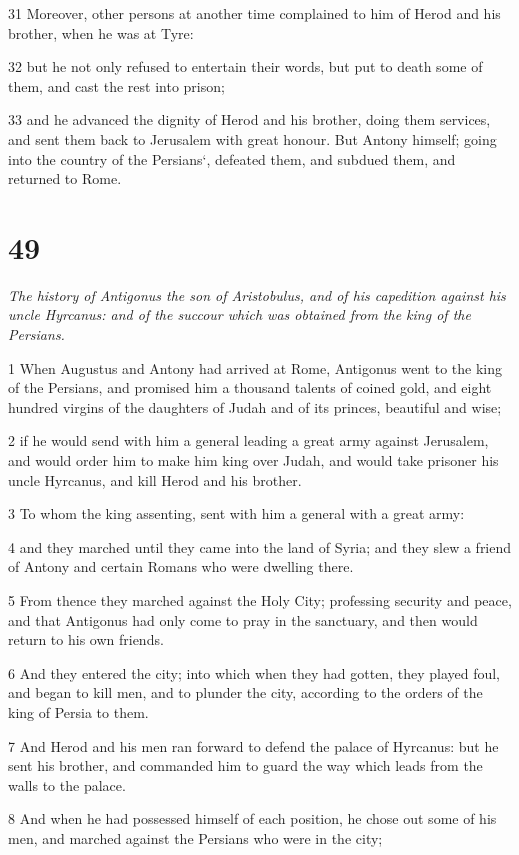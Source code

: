 31 Moreover, other persons at another time complained to him of Herod and his brother, when he was at Tyre: 

32 but he not only refused to entertain their words, but put to death some of them, and cast the rest into prison; 

33 and he advanced the dignity of Herod and his brother, doing them services, and sent them back to Jerusalem with great honour. But Antony himself; going into the country of the Persians‘, defeated them, and subdued them, and returned to Rome. 

\chapter{49}

\par \textit{The history of Antigonus the son of Aristobulus, and of his capedition against his uncle Hyrcanus: and of the succour which was obtained from the king of the Persians.}

1 When Augustus and Antony had arrived at Rome, Antigonus went to the king of the Persians, and promised him a thousand talents of coined gold, and eight hundred virgins of the daughters of Judah and of its princes, beautiful and wise; 

2 if he would send with him a general leading a great army against Jerusalem, and would order him to make him king over Judah, and would take prisoner his uncle Hyrcanus, and kill Herod and his brother. 

3 To whom the king assenting, sent with him a general with a great army: 

4 and they marched until they came into the land of Syria; and they slew a friend of Antony and certain Romans who were dwelling there. 

5 From thence they marched against the Holy City; professing security and peace, and that Antigonus had only come to pray in the sanctuary, and then would return to his own friends. 

6 And they entered the city; into which when they had gotten, they played foul, and began to kill men, and to plunder the city, according to the orders of the king of Persia to them. 

7 And Herod and his men ran forward to defend the palace of Hyrcanus: but he sent his brother, and commanded him to guard the way which leads from the walls to the palace. 

8 And when he had possessed himself of each position, he chose out some of his men, and marched against the Persians who were in the city; 


